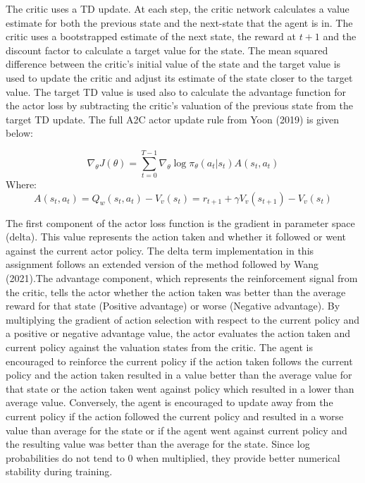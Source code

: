 \documentclass{article}
\begin{document}
The critic uses a TD update. At each step, the critic network calculates a value estimate for both the previous state and the next-state that the agent is in. The critic uses a bootstrapped estimate of the next state, the reward at $t+1$ and the discount factor to calculate a target value for the state. The mean squared difference between the critic's initial value of the state and the target value is used to update the critic and adjust its estimate of the state closer to the target value. The target TD value is used also to calculate the advantage function for the actor loss by subtracting the critic's valuation of the previous state from the target TD update. The full A2C actor update rule from Yoon (2019) is given below:

\begin{equation}
\nabla_{\theta} J(\theta) = \sum_{t=0}^{T-1}\nabla_{\theta}\log{\pi_{\theta}}(a_{t} | s_{t}) A(s_{t}, a_{t})
\end{equation}
Where:
\begin{equation}
A(s_{t}, a_{t}) = Q_{w}(s_{t}, a_{t}) - V_{v}(s_{t}) = r_{t+1} + \gamma V_{v}(s_{t+1}) - V_{v}(s_{t})
\end{equation}

The first component of the actor loss function is the gradient in parameter space (delta). This value represents the action taken and whether it followed or went against the current actor policy. The delta term implementation in this assignment follows an extended version of the method followed by Wang (2021).The advantage component, which represents the reinforcement signal from the critic, tells the actor whether the action taken was better than the average reward for that state (Positive advantage) or worse (Negative advantage). By multiplying the gradient of action selection with respect to the current policy and a positive or negative advantage value, the actor evaluates the action taken and current policy against the valuation states from the critic. The agent is encouraged to reinforce the current policy if the action taken follows the current policy and the action taken resulted in a value better than the average value for that state or the action taken went against policy which resulted in a lower than average value. Conversely, the agent is encouraged to update away from the current policy if the action followed the current policy and resulted in a worse value than average for the state or if the agent went against current policy and the resulting value was better than the average for the state. Since log probabilities do not tend to 0 when multiplied, they provide better numerical stability during training.
\end{document}
